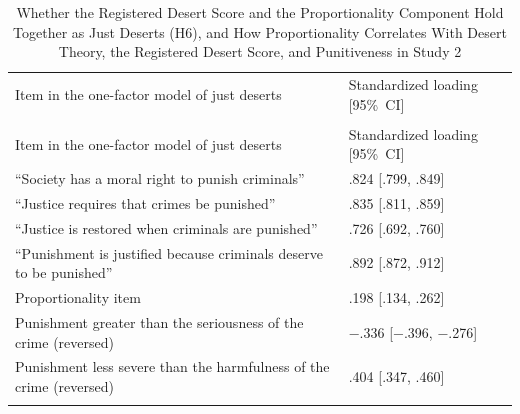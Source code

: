 \begin{longtable}{@{}>{\raggedright\arraybackslash}p{4.550in}>{\centering\arraybackslash}p{1.783in}@{}}
\noalign{\gdef\thetable{S10}}
\caption{Whether the Registered Desert Score and the Proportionality Component Hold Together as Just Deserts (H6), and How Proportionality Correlates With Desert Theory, the Registered Desert Score, and Punitiveness in Study 2}\label{tab:s10}\\
\toprule
Item in the one-factor model of just deserts & Standardized loading {[}95\%~CI{]} \\
\midrule
\endfirsthead
\multicolumn{2}{@{}l}{\textit{Table S10 (continued)}}\\[4pt]
\toprule
Item in the one-factor model of just deserts & Standardized loading {[}95\%~CI{]} \\
\midrule
\endhead
``Society has a moral right to punish criminals'' & .824 {[}.799, .849{]} \\
``Justice requires that crimes be punished'' & .835 {[}.811, .859{]} \\
``Justice is restored when criminals are punished'' & .726 {[}.692, .760{]} \\
``Punishment is justified because criminals deserve to be punished'' & .892 {[}.872, .912{]} \\
Proportionality item & .198 {[}.134, .262{]} \\
Punishment greater than the seriousness of the crime (reversed) & −.336 {[}−.396, −.276{]} \\*
Punishment less severe than the harmfulness of the crime (reversed) & .404 {[}.347, .460{]} \\*
\bottomrule
\end{longtable}
